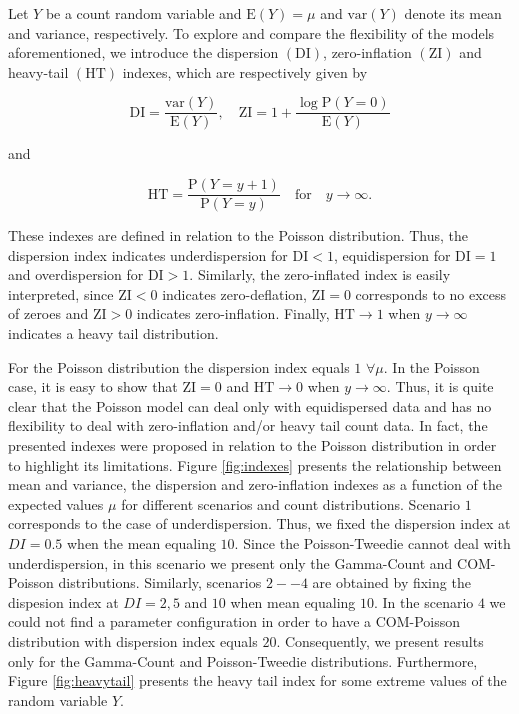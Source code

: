 \documentclass[9pt,a5paper,]{book}
\theoremstyle{definition}
\theoremstyle{definition}
\theoremstyle{remark}
\begin{document}
Let \(Y\) be a count random variable and \(\mathrm{E}(Y) = \mu\) and
\(\mathrm{var}(Y)\) denote its mean and variance, respectively. To
explore and compare the flexibility of the models aforementioned, we
introduce the dispersion \((\mathrm{DI})\), zero-inflation
\((\mathrm{ZI})\) and heavy-tail \((\mathrm{HT})\) indexes, which are
respectively given by

\begin{equation}
\mathrm{DI} = \frac{\mathrm{var}(Y)}{\mathrm{E}(Y)}, \quad
\mathrm{ZI} = 1 + \frac{\log \mathrm{P}(Y = 0)}{\mathrm{E}(Y)}
\end{equation}

and

\begin{equation}
\mathrm{HT} = \frac{\mathrm{P}(Y=y+1)}{\mathrm{P}(Y=y)}\quad \text{for} \quad y \to \infty.
\end{equation}

These indexes are defined in relation to the Poisson distribution. Thus,
the dispersion index indicates underdispersion for \(\mathrm{DI} < 1\),
equidispersion for \(\mathrm{DI} = 1\) and overdispersion for
\(\mathrm{DI} > 1\). Similarly, the zero-inflated index is easily
interpreted, since \(\mathrm{ZI} < 0\) indicates zero-deflation,
\(\mathrm{ZI} = 0\) corresponds to no excess of zeroes and
\(\mathrm{ZI} > 0\) indicates zero-inflation. Finally,
\(\mathrm{HT} \to 1\) when \(y \to \infty\) indicates a heavy tail
distribution.

For the Poisson distribution the dispersion index equals \(1\)
\(\forall \mu\). In the Poisson case, it is easy to show that
\(\mathrm{ZI} = 0\) and \(\mathrm{HT} \to 0\) when \(y \to \infty\).
Thus, it is quite clear that the Poisson model can deal only with
equidispersed data and has no flexibility to deal with zero-inflation
and/or heavy tail count data. In fact, the presented indexes were
proposed in relation to the Poisson distribution in order to highlight
its limitations. Figure \ref{fig:indexes} presents the relationship
between mean and variance, the dispersion and zero-inflation indexes as
a function of the expected values \(\mu\) for different scenarios and
count distributions. Scenario \(1\) corresponds to the case of
underdispersion. Thus, we fixed the dispersion index at \(DI = 0.5\)
when the mean equaling \(10\). Since the Poisson-Tweedie cannot deal
with underdispersion, in this scenario we present only the Gamma-Count
and COM-Poisson distributions. Similarly, scenarios \(2--4\) are
obtained by fixing the dispesion index at \(DI = 2, 5\) and \(10\) when
mean equaling \(10\). In the scenario \(4\) we could not find a
parameter configuration in order to have a COM-Poisson distribution with
dispersion index equals \(20\). Consequently, we present results only
for the Gamma-Count and Poisson-Tweedie distributions. Furthermore,
Figure \ref{fig:heavytail} presents the heavy tail index for some
extreme values of the random variable \(Y\).
\end{document}
